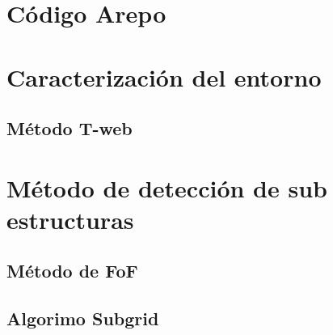 \section{Código Arepo}
\label{sec: codigo arepo}


\section{Caracterización del entorno}
\label{sec: Caracterizacion entorno}

    \subsection{Método T-web}
    \label{subsec: Metodo_T-web}



\section{Método de detección de sub estructuras}
\label{sec: detección sub-estructuras}

    \subsection{Método de FoF}
    \label{subsec: FoF}


    \subsection{Algorimo Subgrid}
    \label{subsec: Algoritmo subgrid}


















